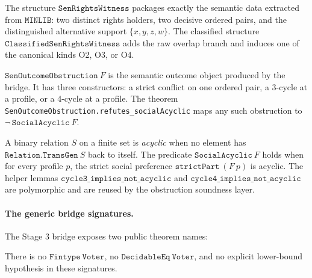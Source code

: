 \begin{definition}
\label{def:obstruction-witness}
The structure \(\mathtt{SenRightsWitness}\) packages exactly the semantic data extracted from \(\mathtt{MINLIB}\): two distinct rights holders, two decisive ordered pairs, and the distinguished alternative support \(\{x,y,z,w\}\).
The classified structure \(\mathtt{ClassifiedSenRightsWitness}\) adds the raw overlap branch and induces one of the canonical kinds O2, O3, or O4.
\end{definition}

\begin{definition}
\label{def:outcome-obstruction}
\(\mathtt{SenOutcomeObstruction}\ F\) is the semantic outcome object produced by the bridge.
It has three constructors: a strict conflict on one ordered pair, a 3-cycle at a profile, or a 4-cycle at a profile.
The theorem \texttt{SenOutcomeObstruction}\allowbreak\texttt{.refutes\_socialAcyclic} maps any such obstruction to \(\neg\,\mathtt{SocialAcyclic}\ F\).
\end{definition}

\begin{definition}
\label{def:acyclic}
A binary relation \(S\) on a finite set is \emph{acyclic} when no element has \(\mathtt{Relation.TransGen}\ S\) back to itself.
The predicate \(\mathtt{SocialAcyclic}\ F\) holds when for every profile \(p\), the strict social preference \(\mathtt{strictPart}\ (F\ p)\) is acyclic.
The helper lemmas \(\mathtt{cycle3\_implies\_not\_acyclic}\) and \(\mathtt{cycle4\_implies\_not\_acyclic}\) are polymorphic and are reused by the obstruction soundness layer.
\end{definition}

\paragraph{The generic bridge signatures.}
The Stage 3 bridge exposes two public theorem names:
\begin{quote}
\end{quote}
\begin{quote}
\end{quote}
There is no \(\mathtt{Fintype\ Voter}\), no \(\mathtt{DecidableEq\ Voter}\), and no explicit lower-bound hypothesis in these signatures.

